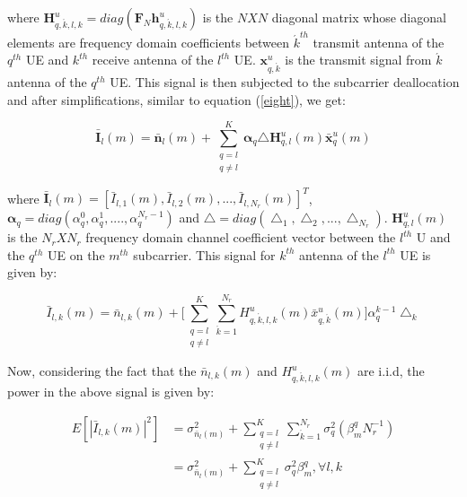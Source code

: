 \documentclass[conference]{IEEEtran}
\begin{document}
where $\mathbf{H}^u_{q,\acute{k},l,k} = diag(\mathbf{F}_N \mathbf{h}^u_{q,\acute{k},l,k})$ is the $N X N$ diagonal matrix whose diagonal elements are frequency domain coefficients between $\acute{k}^{th}$ transmit antenna of the $q^{th}$ UE and $k^{th}$ receive antenna of the $l^{th}$ UE. $\mathbf{x}^u_{q,\acute{k}}$ is the transmit signal from $\acute{k}$ antenna of the $q^{th}$ UE. This signal is then subjected to the subcarrier deallocation and after simplifications, similar to equation (\ref{eight}), we get:

   \begin{equation}
       \label{eighteen}
     \mathbf{\bar{I}}_l (m) = \mathbf{\bar{n}}_l(m) + \sum_{\substack{ q=l \\ q \neq l}}^{K} \mathbf{\alpha}_q \mathbf{\bigtriangleup} \mathbf{H}^u_{q,l}(m)  \mathbf{\bar{x}}^u_q (m)
       \end{equation}

where $\mathbf{\bar{I}}_l (m) = [\bar{I}_{l,1}(m), \bar{I}_{l,2}(m),... ,\bar{I}_{l,N_r}(m)]^T$, $ \mathbf{\alpha}_q =  diag(\alpha_q^{0}, \alpha_q^{1}, ...., \alpha_q^{N_r-1})$ and $\mathbf{\bigtriangleup} = diag(\bigtriangleup_1, \bigtriangleup_2, ..., \bigtriangleup_{N_r})$. $\mathbf{H}^u_{q,l} (m)$  is the $N_r X N_r$ frequency domain channel coefficient vector between the $l^{th}$ U and the $q^{th}$ UE on the $m^{th}$ subcarrier. This signal for $k^{th}$ antenna of the $l^{th}$ UE is given by:

   \begin{equation}
       \label{nineteen}
     \bar{I}_{l,k}(m) = \bar{n}_{l,k}(m) + \Big [ \sum_{\substack{ q=l \\ q \neq l}}^{K} \sum_{\acute{k}=1}^{N_r} H^u_{q,\acute{k},l,k}(m) \bar{x}^u_{q,\acute{k}}(m) \Big ] \alpha^{k-1}_{q}  \bigtriangleup_k
    \end{equation}
    
Now, considering the fact that the $\bar{n}_{l,k}(m)$ and $H^u_{q,\acute{k},l,k}(m)$ are i.i.d, the power in the above signal is given by:

\begin{equation}
       \label{twenty}
       \begin{split}
     E[|\bar{I}_{l,k}(m)|^2] &= \sigma^2_{\bar{n}_{l}(m)} +  \sum_{\substack{ q=l \\ q \neq l}}^{K} \sum_{\acute{k}=1}^{N_r} \sigma_q^2 (\beta^q_m N_r^{-1}) \\
     & = \sigma^2_{\bar{n}_{l}(m)} + \sum_{\substack{ q=l \\ q \neq l}}^{K} \sigma_q^2 \beta^q_m, \forall l, k
     \end{split}
     \end{equation}
     
\end{document}
